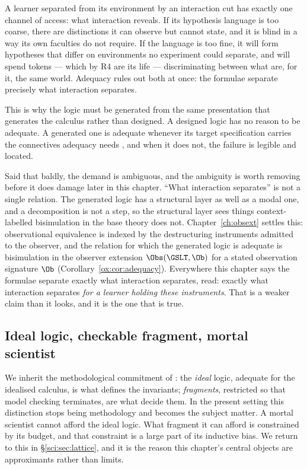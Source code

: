 A learner separated from its environment by an interaction cut has exactly one channel of access: what
interaction reveals. If its hypothesis language is too coarse, there are distinctions it can observe
but cannot state, and it is blind in a way its own faculties do not require. If the language is too
fine, it will form hypotheses that differ on environments no experiment could separate, and will spend
tokens --- which by R4 are its life --- discriminating between what are, for it, the same world.
Adequacy rules out both at once: the formulae separate precisely what interaction separates.

This is why the logic must be generated from the same presentation that generates the calculus rather
than designed. A designed logic has no reason to be adequate. A generated one is adequate whenever its
target specification carries the connectives adequacy needs \cite[\S1.3]{ClassifierNote}, and when it
does not, the failure is legible and located.

\begin{remark}
\label{sci:rem:adequacy-index}
Said that baldly, the demand is ambiguous, and the ambiguity is worth removing before it does damage
later in this chapter. ``What interaction separates'' is not a single relation. The generated logic has
a structural layer as well as a modal one, and a decomposition is not a step, so the structural layer
sees things context-labelled bisimulation in the base theory does not. Chapter~\ref{ch:obsext} settles
this: observational equivalence is indexed by the destructuring instruments admitted to the observer,
and the relation for which the generated logic is adequate is bisimulation in the observer extension
$\Obs(\GSLT,\Ob)$ for a stated observation signature $\Ob$
(Corollary~\ref{ox:cor:adequacy}). Everywhere this chapter says the formulae separate exactly what
interaction separates, read: exactly what interaction separates \emph{for a learner holding these
instruments}. That is a weaker claim than it looks, and it is the one that is true.
\end{remark}

\subsection{Ideal logic, checkable fragment, mortal scientist}\label{sci:S1.6}

We inherit the methodological commitment of \cite{ClassifierNote}: the \emph{ideal} logic, adequate
for the idealised calculus, is what defines the invariants; \emph{fragments}, restricted so that model
checking terminates, are what decide them. In the present setting this distinction stops being
methodology and becomes the subject matter. A mortal scientist cannot afford the ideal logic. What
fragment it can afford is constrained by its budget, and that constraint is a large part of its
inductive bias. We return to this in \S\ref{sci:sec:lattice}, and it is the reason this chapter's
central objects are approximants rather than limits.

